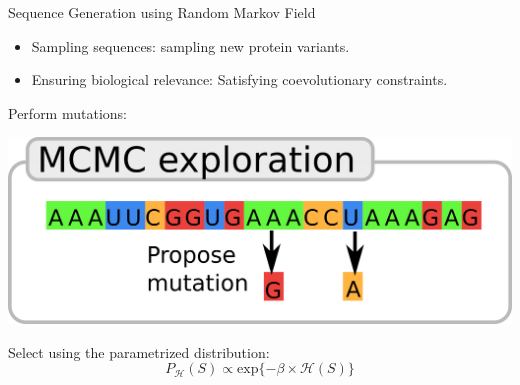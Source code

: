 \documentclass[presentation,smaller]{beamer}
\begin{document}
\begin{frame}[label={sec:org09a1801}]{Sequence Generation using Random Markov Field}
\begin{itemize}
\item Sampling sequences: sampling new protein variants.
\item Ensuring biological relevance: Satisfying coevolutionary constraints.
\end{itemize}

Perform mutations:
\begin{center}
\begin{center}
\includegraphics[scale=0.3]{./img/mcmc_seq.png}
\end{center}
\end{center}

Select using the parametrized distribution:
\begin{equation*}
P_{\mathcal{H}}(S) \propto \text{exp}\{-\beta \times \mathcal{H}(S)\}
\end{equation*}
\end{frame}
\end{document}
